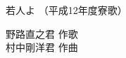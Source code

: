 \documentclass[10pt,b5j]{tarticle} %
\begin{document}
\begin{minipage}[c]{0.7\hsize} %
    \begin{center}
        {\LARGE
            若人よ %
        }
        {\small 
            （平成12年度寮歌） %
        }
    \end{center}
\end{minipage}
\begin{minipage}[c]{0.3\hsize} %
    \begin{flushright} %
        野路直之君 作歌\\村中剛洋君 作曲 %
    \end{flushright}
\end{minipage}
\end{document}
